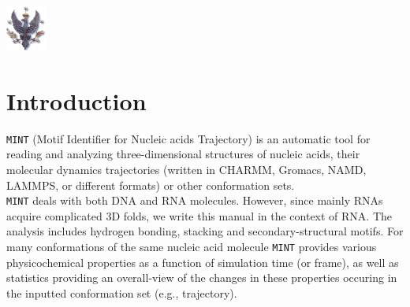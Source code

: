 \documentclass[12pt]{article}
\begin{document}
     {}  \includegraphics[width=0.1\textwidth]{./pictures/logoUW.png}

\newpage
\tableofcontents
\newpage
\newcommand*{\elem}[1]{{\color{Gray}{\tt{<#1>}}}}
\newcommand*{\greyT}[1]{{\color{Gray}{\tt{#1}}}}

\section{Introduction}
{\tt MINT} (Motif Identifier for Nucleic acids Trajectory) is an automatic tool for reading and analyzing three-dimensional structures of nucleic acids, their molecular dynamics trajectories (written in CHARMM, Gromacs, NAMD, LAMMPS, or different formats) or other conformation sets.\\

\noindent
{\tt MINT} deals with both DNA and RNA molecules. However, since mainly RNAs acquire complicated 3D folds, we write this manual in the context of RNA. The analysis includes hydrogen bonding, stacking and secondary-structural motifs. For many conformations of the same nucleic acid molecule {\tt MINT} provides various physicochemical properties as a function of simulation time (or frame), as well as statistics providing an overall-view of the changes in these properties occuring in the inputted conformation set (e.g., trajectory).\\
\end{document}
